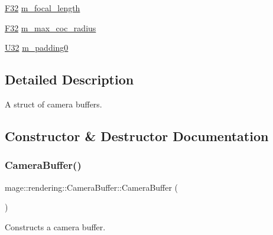 \begin{DoxyCompactItemize}
\item 
\hyperlink{namespacemage_aa97e833b45f06d60a0a9c4fc22ae02c0}{F32} \hyperlink{structmage_1_1rendering_1_1_camera_buffer_a7ed5079582d476597f8bc4d6a0b3f372}{m\+\_\+focal\+\_\+length}
\item 
\hyperlink{namespacemage_aa97e833b45f06d60a0a9c4fc22ae02c0}{F32} \hyperlink{structmage_1_1rendering_1_1_camera_buffer_a3273510e0a7bbdd9481fe67f9e223f59}{m\+\_\+max\+\_\+coc\+\_\+radius}
\item 
\hyperlink{namespacemage_a41c104c036fba3756a74e19f793eeaa1}{U32} \hyperlink{structmage_1_1rendering_1_1_camera_buffer_a253bf6bedadf6fa508172ed5efe2e6d7}{m\+\_\+padding0}
\end{DoxyCompactItemize}


\subsection{Detailed Description}
A struct of camera buffers. 

\subsection{Constructor \& Destructor Documentation}
\hypertarget{structmage_1_1rendering_1_1_camera_buffer_a751c2923a5deb710d7c3957f04c89fcf}{}\label{structmage_1_1rendering_1_1_camera_buffer_a751c2923a5deb710d7c3957f04c89fcf} 
\subsubsection{\texorpdfstring{Camera\+Buffer()}{CameraBuffer()}\hspace{0.1cm}{\footnotesize\ttfamily [1/3]}}
{\footnotesize\ttfamily mage\+::rendering\+::\+Camera\+Buffer\+::\+Camera\+Buffer (\begin{DoxyParamCaption}{ }\end{DoxyParamCaption})\hspace{0.3cm}{\ttfamily [noexcept]}}

Constructs a camera buffer. \hypertarget{structmage_1_1rendering_1_1_camera_buffer_a08ff60a4695d723218c5cffb4b95cc59}{}\label{structmage_1_1rendering_1_1_camera_buffer_a08ff60a4695d723218c5cffb4b95cc59} 
